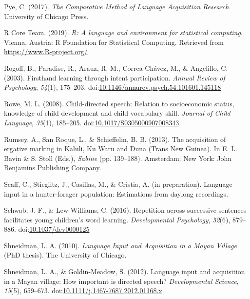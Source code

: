 \documentclass[,man,mask,floatsintext]{apa6}
\begin{document}
\hypertarget{ref-pye2017comparative}{}
Pye, C. (2017). \emph{The Comparative Method of Language Acquisition
Research}. University of Chicago Press.

\hypertarget{ref-R-base}{}
R Core Team. (2019). \emph{R: A language and environment for statistical
computing}. Vienna, Austria: R Foundation for Statistical Computing.
Retrieved from \url{https://www.R-project.org/}

\hypertarget{ref-rogoff2003firsthand}{}
Rogoff, B., Paradise, R., Arauz, R. M., Correa-Chávez, M., \& Angelillo,
C. (2003). Firsthand learning through intent participation. \emph{Annual
Review of Psychology}, \emph{54}(1), 175--203.
doi:\href{https://doi.org/10.1146/annurev.psych.54.101601.145118}{10.1146/annurev.psych.54.101601.145118}

\hypertarget{ref-rowe2008child}{}
Rowe, M. L. (2008). Child-directed speech: Relation to socioeconomic
status, knowledge of child development and child vocabulary skill.
\emph{Journal of Child Language}, \emph{35}(1), 185--205.
doi:\href{https://doi.org/10.1017/S0305000907008343}{10.1017/S0305000907008343}

\hypertarget{ref-rumsey2013ergative}{}
Rumsey, A., San Roque, L., \& Schieffelin, B. B. (2013). The acquisition
of ergative marking in Kaluli, Ku Waru and Duna (Trans New Guinea). In
E. L. Bavin \& S. Stoll (Eds.), \emph{Sabine} (pp. 139--188). Amsterdam;
New York: John Benjamins Publishing Company.

\hypertarget{ref-scaffIPlanguage}{}
Scaff, C., Stieglitz, J., Casillas, M., \& Cristia, A. (in preparation).
Language input in a hunter-forager population: Estimations from daylong
recordings.

\hypertarget{ref-schwab2016repetition}{}
Schwab, J. F., \& Lew-Williams, C. (2016). Repetition across successive
sentences facilitates young children's word learning.
\emph{Developmental Psychology}, \emph{52}(6), 879--886.
doi:\href{https://doi.org/10.1037/dev0000125}{10.1037/dev0000125}

\hypertarget{ref-shneidman2010language}{}
Shneidman, L. A. (2010). \emph{Language Input and Acquisition in a Mayan
Village} (PhD thesis). The University of Chicago.

\hypertarget{ref-shneidman2012language}{}
Shneidman, L. A., \& Goldin-Meadow, S. (2012). Language input and
acquisition in a Mayan village: How important is directed speech?
\emph{Developmental Science}, \emph{15}(5), 659--673.
doi:\href{https://doi.org/10.1111/j.1467-7687.2012.01168.x}{10.1111/j.1467-7687.2012.01168.x}
\end{document}
